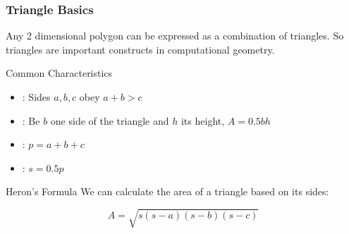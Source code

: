 \documentclass{beamer}
\begin{document}
\begin{frame}
  \frametitle{Triangle Basics}
  {\smaller
    Any 2 dimensional polygon can be expressed as a combination of
    triangles. So triangles are important constructs in computational
    geometry.

    \begin{block}{Common Characteristics}
      \begin{itemize}
      \item {}: Sides $a,b,c$ obey $a+b > c$
      \item {}: Be $b$ one side of the triangle
        and $h$ its height, $A=0.5bh$
      \item {}: $p=a+b+c$
      \item {}: $s = 0.5p$
      \end{itemize}
    \end{block}

    \begin{block}{Heron's Formula}
      We can calculate the area of a triangle based on its sides:

      \begin{equation*}
        A = \sqrt{s(s-a)(s-b)(s-c)}
      \end{equation*}
    \end{block}


  }
\end{frame}

\end{document}

